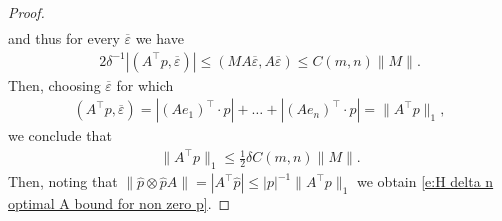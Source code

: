 \documentclass[reqno]{amsart}
\numberwithin{equation}{section}
\begin{document}
\begin{proof}
\begin{align*}
\end{align*}
and thus for every $\overline \varepsilon$ we have
\begin{align*}
  2\delta^{-1}|(A^\top p,\overline \varepsilon)| \leq (MA\overline \varepsilon, A\overline \varepsilon) \leq C(m,n)\|M\|.
\end{align*}
Then, choosing $\overline \varepsilon$ for which
\begin{align*}
  (A^\top p,\overline \varepsilon)= |(Ae_1)^\top\cdot p| + \ldots + |(Ae_n)^\top\cdot p| = \|A^\top p\|_1,   
\end{align*}
we conclude that 
\begin{align*}
  \|A^\top p\|_1 \leq \tfrac{1}{2}\delta C(m,n)\|M\|.      
\end{align*}
Then, noting that $\|\hat p \otimes \hat p A\| =| A^\top \hat p| \leq |p|^{-1}\| A^\top  p\|_1$ we obtain \eqref{e:H delta n optimal A bound for non zero p}.


\end{proof}
\end{document}
